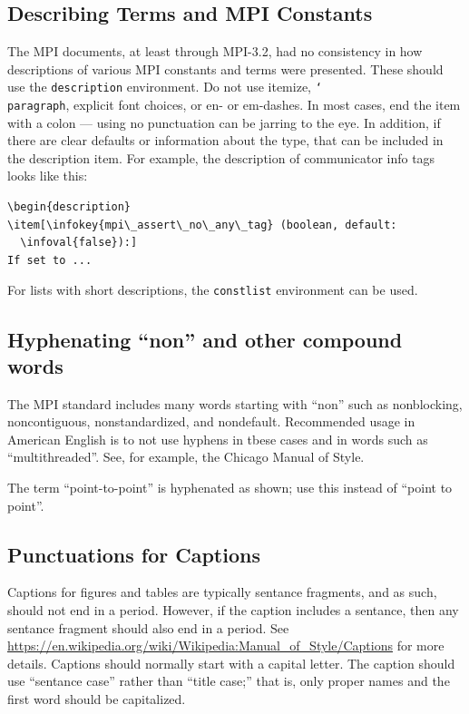 \documentclass[letterpaper,twoside,11pt,fleqn]{article}
\def\cmd#1{\texttt{\char`\\#1}}
\def\MPI/{\textsf{MPI}}    %
\begin{document}
\subsection{Describing Terms and \MPI/ Constants}
The \MPI/ documents, at least through \MPI/-3.2, had no consistency in
how descriptions of various \MPI/ constants and terms were presented.
These should use the \texttt{description} environment.  Do not use itemize,
\cmd{paragraph}, explicit font choices, or en- or em-dashes.
In most cases, end the item with a colon --- using no punctuation can
be jarring to the eye.
In addition, if there are clear defaults or information about the
type, that can be included in the description item.  For example,
the description of communicator info tags looks like this:
\begin{verbatim}
\begin{description}
\item[\infokey{mpi\_assert\_no\_any\_tag} (boolean, default:
  \infoval{false}):]
If set to ...
\end{verbatim}

For lists with short descriptions, the \texttt{constlist} environment can be
used.

\subsection{Hyphenating ``non'' and other compound words}
The \MPI/ standard includes many words starting with ``non'' such as
nonblocking, noncontiguous, nonstandardized, and nondefault.
Recommended usage in American English is to not use hyphens in tbese
cases and in words such as ``multithreaded''.
See, for example, the Chicago Manual of Style.

The term ``point-to-point'' is hyphenated as shown; use this instead
of ``point to point''.

\subsection{Punctuations for Captions}
Captions for figures and tables are typically sentance fragments, and
as such, should not end in a period.
However, if the caption includes a sentance, then any sentance
fragment should also end in a period.
See
\url{https://en.wikipedia.org/wiki/Wikipedia:Manual_of_Style/Captions}
for more details.
Captions should normally start with a capital letter.
The caption should use ``sentance case'' rather than ``title case;''
that is, only proper names and the first word should be capitalized.
\end{document}
